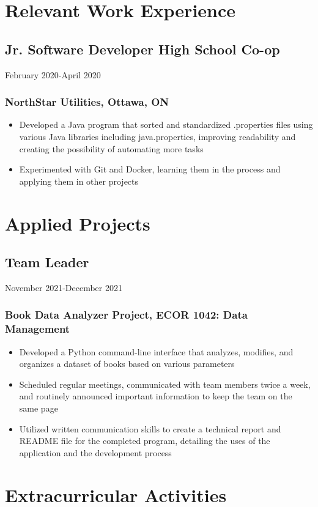 \documentclass{article}
\newenvironment{itemlist}
{\begin{itemize}
	\setlength{\itemsep}{0em}
	\setlength{\parskip}{0em}
	\setlength{\parsep}{0em}
}
{\end{itemize}}
\begin{document}
\section{Relevant Work Experience}
\subsection{Jr. Software Developer High School Co-op}\hfill{February 2020-April 2020}
\subsubsection{NorthStar Utilities, Ottawa, ON}
\begin{itemlist}
\item Developed a Java program that sorted and standardized .properties files using various Java libraries including java.properties, improving readability and creating the possibility of automating more tasks
\item Experimented with Git and Docker, learning them in the process and applying them in other projects
\end{itemlist}

\section{Applied Projects}
\subsection{Team Leader}\hfill{November 2021-December 2021}
\subsubsection{Book Data Analyzer Project, ECOR 1042: Data Management}
\begin{itemlist}
\item Developed a Python command-line interface that analyzes, modifies, and organizes a dataset of books based on various parameters
\item Scheduled regular meetings, communicated with team members twice a week, and routinely announced important information to keep the team on the same page
\item Utilized written communication skills to create a technical report and README file for the completed program, detailing the uses of the application and the development process
\end{itemlist}

\section{Extracurricular Activities}
\end{document}
